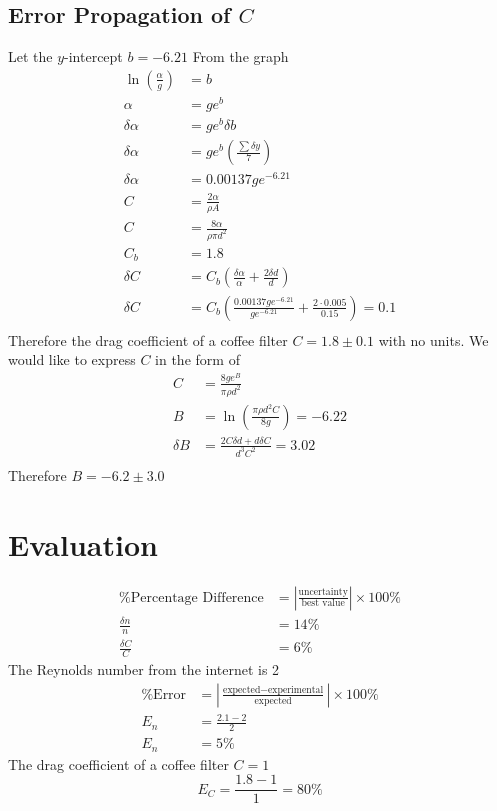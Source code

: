 \documentclass{article}
\begin{document}
\subsection{Error Propagation of $C$}
Let the $y$-intercept $b=-6.21$ From the graph
\begin{align*}
    \ln\left(\frac{\alpha}{g}\right)&=b\\
    \alpha&=ge^b\\
    \delta\alpha&=ge^b\delta b\\
    \delta\alpha&=ge^b\left(\frac{\sum \delta y}{7}\right)\\
    \delta\alpha&=0.00137ge^{-6.21}\\
    C&=\frac{2\alpha}{\rho A}\\
    C&=\frac{8\alpha}{\rho\pi d^2}\\
    C_b&=1.8\\
    \delta C&=C_b\left(\frac{\delta\alpha}{\alpha}+\frac{2\delta d}{d}\right)\\
    \delta C&=C_b\left(\frac{0.00137ge^{-6.21}}{ge^{-6.21}}+\frac{2\cdot 0.005}{0.15}\right)=0.1\\
    \end{align*}
Therefore the drag coefficient of a coffee filter $C=1.8\pm 0.1$ with no units. We would like to express $C$ in the form of
\begin{align*}
    C&=\frac{8ge^B}{\pi\rho d^2}\\
    B&=\ln\left(\frac{\pi\rho d^2C}{8g}\right)=-6.22\\
    \delta B&=\frac{2C\delta d+d\delta C}{d^3C^2}=3.02\\
\end{align*}
Therefore $B=-6.2\pm 3.0$


\pagebreak
\section{Evaluation}
\begin{align*}
    \%\text{Percentage Difference}&=\left|\frac{\text{uncertainty}}{\text{best value}}\right|\times 100\%\\
    \frac{\delta n}{n}&=14\%\\
    \frac{\delta C}{C}&=6\%
\end{align*}
The Reynolds number from the internet is 2
\begin{align*}
    \%\text{Error}&=\left|\frac{\text{expected}-\text{experimental}}{\text{expected}}\right|\times 100\%\\
    E_n&=\frac{2.1-2}{2}\\
    E_n&=5\%
\end{align*}
The drag coefficient of a coffee filter $C=1$
\[E_C=\frac{1.8-1}{1}=80\%\]
\end{document}
